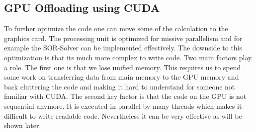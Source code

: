 \subsection{GPU Offloading using CUDA}
To further optimize the code one can move some of the calculation to the graphics card. The processing unit is optimized for missive parallelism and for example the SOR-Solver can be implemented effectively. The downside to this optimization is that its much more complex to write code. Two main factors play a role. The first one is that we lose unified memory. This requires us to spend some work on transferring data from main memory to the GPU memory and back cluttering the code and making it hard to understand for someone not familiar with CUDA. The second key factor is that the code on the GPU is not sequential anymore. It is executed in parallel by many threads which makes it difficult to write readable code.\newline
Nevertheless it can be very effective as will be shown later.
